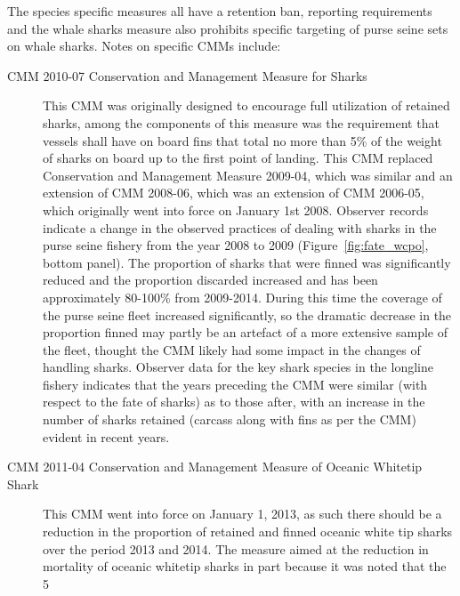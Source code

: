 \documentclass[12pt]{SCreport}
\begin{document}
The species specific measures all have a retention ban, reporting requirements and the whale sharks measure also prohibits specific targeting of purse seine sets on whale sharks. Notes on specific CMMs include:
\begin{description}
 \item[CMM 2010-07 Conservation and Management Measure for Sharks] This CMM was originally designed to encourage full utilization of retained sharks, among the components of this measure was the requirement that vessels shall have on board fins that total no more than 5\% of the weight of sharks on board up to the first point of landing. This CMM replaced Conservation and Management Measure 2009-04, which was similar and an extension of CMM 2008-06, which was an extension of CMM 2006-05, which originally went into force on January 1st 2008. Observer records indicate a change in the observed practices of dealing with sharks in the purse seine fishery from the year 2008 to 2009 (Figure~\ref{fig:fate_wcpo}, bottom panel). 
The proportion of sharks that were finned was significantly reduced and the proportion discarded increased and has been approximately 80-100\% from 2009-2014. During this time the coverage of the purse seine fleet increased significantly, so the dramatic decrease in the proportion finned may partly be an artefact of a more extensive sample of the fleet, thought the CMM likely had some impact in the changes of handling sharks. Observer data for the key shark species in the longline fishery indicates that the years preceding the CMM were similar (with respect to the fate of sharks) as to those after, with an increase in the number of sharks retained (carcass along with fins as per the CMM) evident in recent years.
 
 
 
 \item[CMM 2011-04 Conservation and Management Measure of Oceanic Whitetip Shark] This CMM went into force on January 1, 2013, as such there should be a reduction in the proportion of retained and finned oceanic white tip sharks over the period 2013 and 2014. The measure aimed at the reduction in mortality of oceanic whitetip sharks in part because it was noted that the 5%


\end{description}
\end{document}
